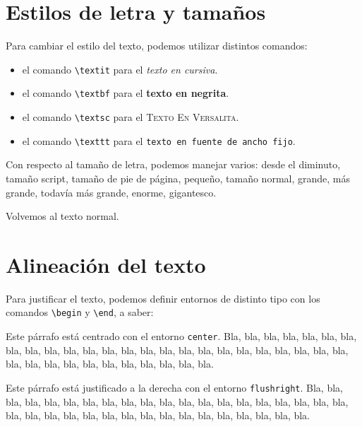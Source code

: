 \documentclass[a4paper]{article}
\begin{document}
\section{Estilos de letra y tamaños}
\label{estilos}

Para cambiar el estilo del texto, podemos utilizar distintos comandos:

\begin{itemize}
\item el comando \texttt{\textbackslash textit} para el \textit{texto en cursiva}.

\item el comando \texttt{\textbackslash textbf} para el \textbf{texto en negrita}.

\item el comando \texttt{\textbackslash textsc} para el \textsc{Texto En Versalita}.

\item el comando \texttt{\textbackslash texttt} para el \texttt{texto en fuente de ancho fijo}.

\end{itemize}


Con respecto al tamaño de letra, podemos manejar varios: desde el \tiny{diminuto}, \scriptsize{tamaño script}, \footnotesize{tamaño de pie de página}, \small{pequeño}, tamaño normal, \large{grande}, \Large{más grande}, \LARGE{todavía más grande}, \huge{enorme}, \Huge{gigantesco}.

\normalsize{Volvemos al texto normal.}



\section{Alineación del texto}
\label{alineacion}

Para justificar el texto, podemos definir entornos de distinto tipo con los comandos \texttt{\textbackslash begin} y \texttt{\textbackslash end}, a saber:

\begin{center}
Este párrafo está centrado con el entorno \texttt{center}. Bla, bla, bla, bla, bla, bla, bla, bla, bla, bla, bla, bla, bla, bla, bla, bla, bla, bla, bla, bla, bla, bla, bla, bla, bla, bla, bla, bla, bla, bla, bla, bla, bla, bla, bla, bla.
\end{center}


\begin{flushright}
Este párrafo está justificado a la derecha con el entorno \texttt{flushright}. Bla, bla, bla, bla, bla, bla, bla, bla, bla, bla, bla, bla, bla, bla, bla, bla, bla, bla, bla, bla, bla, bla, bla, bla, bla, bla, bla, bla, bla, bla, bla, bla, bla, bla, bla, bla.
\end{flushright}
\end{document}
